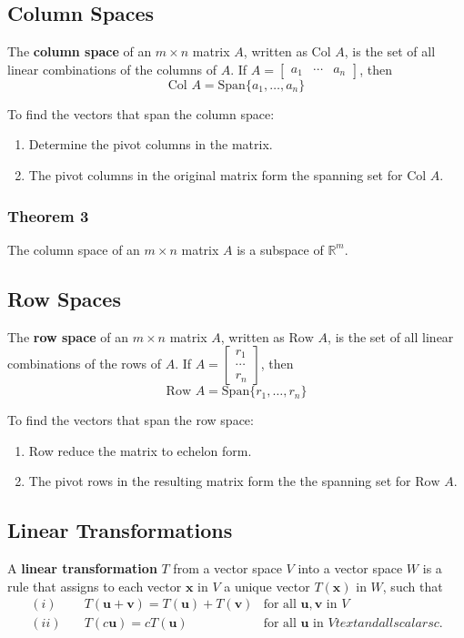 \documentclass{article}
\begin{document}
\subsection*{Column Spaces}
The \textbf{column space} of an $m\times n$ matrix $A$, written as $\text{Col } A$, is the set of
all linear combinations of the columns of $A$. If
$A=\begin{bmatrix}a_1 & \cdots & a_n\end{bmatrix}$, then
\[\text{Col } A = \text{Span}\{a_1, \ldots, a_n\}\]

To find the vectors that span the column space:
\begin{enumerate}
    \item Determine the pivot columns in the matrix.
    \item The pivot columns in the original matrix form the spanning set for $\text{Col } A$.
\end{enumerate}

\subsubsection*{Theorem 3}
The column space of an $m\times n$ matrix $A$ is a subspace of $\mathbb{R}^m$.

\pagebreak

\subsection*{Row Spaces}
The \textbf{row space} of an $m\times n$ matrix $A$, written as $\text{Row } A$, is the set of all
linear combinations of the rows of $A$. If $A=\begin{bmatrix}r_1 \\ \cdots \\ r_n\end{bmatrix}$,
then
\[\text{Row } A = \text{Span}\{r_1, \ldots, r_n\}\]

To find the vectors that span the row space:
\begin{enumerate}
    \item Row reduce the matrix to echelon form.
    \item The pivot rows in the resulting matrix form the the spanning set for $\text{Row } A$.
\end{enumerate}

\subsection*{Linear Transformations}
A \textbf{linear transformation} $T$ from a vector space $V$ into a vector space $W$ is a rule that
assigns to each vector $\mathbf{x}$ in $V$ a unique vector $T(\mathbf{x})$ in $W$, such that
\begin{align*}
    (i) &\quad T(\mathbf{u} + \mathbf{v}) = T(\mathbf{u}) + T(\mathbf{v}) & \text{for all }
    \mathbf{u}, \mathbf{v} \text{ in } V \\
    (ii) &\quad T(c \mathbf{u}) = c T(\mathbf{u}) & \text{for all } \mathbf{u} \text{ in } V 
    text{ and all scalars } c.
\end{align*}
\end{document}
